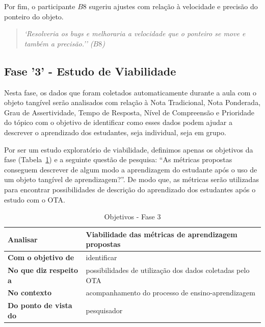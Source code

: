 Por fim, o participante $B8$ sugeriu ajustes com relação à velocidade e precisão do ponteiro do objeto.

\begin{quote}
	\textit{`Resolveria os bugs e melhoraria a velocidade que o ponteiro se move e também a precisão.'' ($B8$)}
\end{quote}



\subsection{Fase '3' - Estudo de Viabilidade}\label{subsec:fase3}

Nesta fase, os dados que foram coletados automaticamente durante a aula com o objeto tangível serão analisados com relação à Nota Tradicional, Nota Ponderada, Grau de Assertividade, Tempo de Resposta, Nível de Compreensão e Prioridade do tópico com o objetivo de identificar como esses dados podem ajudar a descrever o aprendizado dos estudantes, seja individual, seja em grupo.

Por ser um estudo exploratório de viabilidade, definimos apenas os objetivos da fase (Tabela~\ref{tab:F3_Goals}) e a seguinte questão de pesquisa: ``As métricas propostas conseguem descrever de algum modo a aprendizagem do estudante após o uso de um objeto tangível de aprendizagem?''. De modo que, as métricas serão utilizadas para encontrar possibilidades de descrição do aprendizado dos estudantes após o estudo com o OTA.

\begin{table}[htbp]
	\centering
	\caption{Objetivos - Fase 3}
	\begin{tabular}{|l|l|}
		\hline
		\textbf{Analisar}             & Viabilidade das métricas de aprendizagem propostas \\ \hline
		\textbf{Com o objetivo de}    & identificar                                        \\ \hline
		\textbf{No que diz respeito a} & possibilidades de utilização dos dados coletadas pelo OTA \\ \hline
		\textbf{No contexto}          & acompanhamento do processo de ensino-aprendizagem  \\ \hline
		\textbf{Do ponto de vista do} & pesquisador                                        \\ \hline
	\end{tabular}
	\label{tab:F3_Goals}
\end{table}

